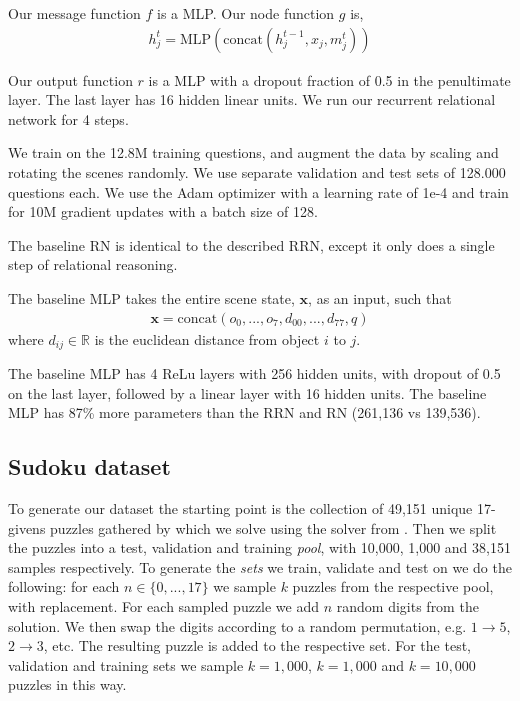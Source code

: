 Our message function $f$ is a MLP. Our node function $g$ is,
\begin{align*}
	h_j^t = \text{MLP}(\text{concat}(h_j^{t-1}, x_j, m_{j}^t))
\end{align*}

Our output function $r$ is a MLP with a dropout fraction of 0.5 in the penultimate layer. The last layer has 16 hidden linear units. We run our recurrent relational network for 4 steps.

We train on the 12.8M training questions, and augment the data by scaling and rotating the scenes randomly. We use separate validation and test sets of 128.000 questions each. We use the Adam optimizer with a learning rate of 1e-4 and train for 10M gradient updates with a batch size of 128.

The baseline RN is identical to the described RRN, except it only does a single step of relational reasoning.

The baseline MLP takes the entire scene state, $\mathbf{x}$, as an input, such that
\begin{align*}
	\mathbf{x} = \text{concat}(o_0, ..., o_7, d_{00}, ..., d_{77}, q)
\end{align*}
where $d_{ij} \in \mathbb{R}$ is the euclidean distance from object $i$ to $j$.

The baseline MLP has 4 ReLu layers with 256 hidden units, with dropout of 0.5 on the last layer, followed by a linear layer with 16 hidden units. The baseline MLP has 87\% more parameters than the RRN and RN (261,136 vs 139,536).

\subsection{Sudoku dataset}
To generate our dataset the starting point is the collection of 49,151 unique 17-givens puzzles gathered by \citet{royle2016minimum} which we solve using the solver from \citet{norvig2006solving}.
Then we split the puzzles into a test, validation and training \emph{pool}, with 10,000, 1,000 and 38,151 samples respectively.
To generate the \emph{sets} we train, validate and test on we do the following: for each $n \in \{0,...,17\}$ we sample $k$ puzzles from the respective pool, with replacement. For each sampled puzzle we add $n$ random digits from the solution. We then swap the digits according to a random permutation, e.g. $1 \to 5$, $2 \to 3$, etc. The resulting puzzle is added to the respective set. For the test, validation and training sets we sample $k=1,000$, $k=1,000$ and $k=10,000$ puzzles in this way. 


